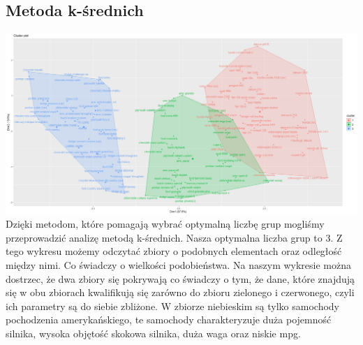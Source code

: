 \documentclass{article}
\begin{document}
    \subsection{Metoda k-średnich}    
        \includegraphics[width = \textwidth]{kmeans_fig}
        Dzięki metodom, które pomagają wybrać optymalną liczbę grup mogliśmy przeprowadzić analizę metodą k-średnich. 
        Nasza optymalna liczba grup to 3. 
        \newline\newline Z tego wykresu możemy odczytać zbiory o podobnych elementach oraz odległość między nimi. 
        Co świadczy o wielkości podobieństwa. Na naszym wykresie można dostrzec, że dwa zbiory się pokrywają co świadczy o tym, że dane, 
        które znajdują się w obu zbiorach kwalifikują się zarówno do zbioru zielonego i czerwonego, czyli ich parametry są do siebie zbliżone.
        \newline\newline
        W zbiorze niebieskim są tylko samochody pochodzenia amerykańskiego, te samochody charakteryzuje duża pojemność silnika, wysoka objętość skokowa silnika, duża 
        waga oraz niskie mpg.

        
\end{document}
